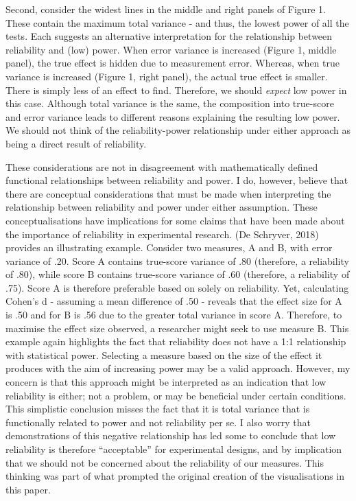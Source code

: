 \documentclass[english,,man]{apa6}
\begin{document}
Second, consider the widest lines in the middle and right panels of Figure 1. These contain the maximum total variance - and thus, the lowest power of all the tests. Each suggests an alternative interpretation for the relationship between reliability and (low) power. When error variance is increased (Figure 1, middle panel), the true effect is hidden due to measurement error. Whereas, when true variance is increased (Figure 1, right panel), the actual true effect is smaller. There is simply less of an effect to find. Therefore, we should \emph{expect} low power in this case. Although total variance is the same, the composition into true-score and error variance leads to different reasons explaining the resulting low power. We should not think of the reliability-power relationship under either approach as being a direct result of reliability.

These considerations are not in disagreement with mathematically defined functional relationships between reliability and power. I do, however, believe that there are conceptual considerations that must be made when interpreting the relationship between reliability and power under either assumption. These conceptualisations have implications for some claims that have been made about the importance of reliability in experimental research. (De Schryver, 2018) provides an illustrating example. Consider two measures, A and B, with error variance of .20. Score A contains true-score variance of .80 (therefore, a reliability of .80), while score B contains true-score variance of .60 (therefore, a reliability of .75). Score A is therefore preferable based on solely on reliability. Yet, calculating Cohen's d - assuming a mean difference of .50 - reveals that the effect size for A is .50 and for B is .56 due to the greater total variance in score A. Therefore, to maximise the effect size observed, a researcher might seek to use measure B. This example again highlights the fact that reliability does not have a 1:1 relationship with statistical power. Selecting a measure based on the size of the effect it produces with the aim of increasing power may be a valid approach. However, my concern is that this approach might be interpreted as an indication that low reliability is either; not a problem, or may be beneficial under certain conditions. This simplistic conclusion misses the fact that it is total variance that is functionally related to power and not reliability per se. I also worry that demonstrations of this negative relationship has led some to conclude that low reliability is therefore \enquote{acceptable} for experimental designs, and by implication that we should not be concerned about the reliability of our measures. This thinking was part of what prompted the original creation of the visualisations in this paper.
\end{document}
